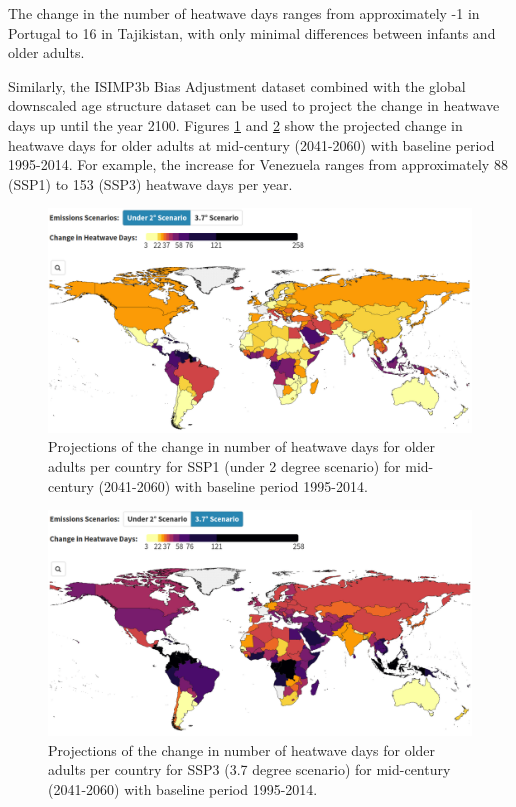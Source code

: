 \documentclass[
]{krantz}
\begin{document}
The change in the number of heatwave days ranges from approximately -1 in Portugal to 16 in Tajikistan, with only minimal differences between infants and older adults.

Similarly, the ISIMP3b Bias Adjustment dataset combined with the global downscaled age structure dataset can be used to project the change in heatwave days up until the year 2100. Figures \ref{fig:heatwaves2ssp1strobl} and \ref{fig:heatwaves2ssp3strobl} show the projected change in heatwave days for older adults at mid-century (2041-2060) with baseline period 1995-2014. For example, the increase for Venezuela ranges from approximately 88 (SSP1) to 153 (SSP3) heatwave days per year.

\begin{figure}

{\centering \includegraphics[width=0.8\linewidth]{work/08-lancet/figures/indicator_1_3} 

}

\caption{Projections of the change in number of heatwave days for older adults per country for SSP1 (under 2 degree scenario) for mid-century (2041-2060) with baseline period 1995-2014.}\label{fig:heatwaves2ssp1strobl}
\end{figure}
\begin{figure}

{\centering \includegraphics[width=0.8\linewidth]{work/08-lancet/figures/indicator_1_4} 

}

\caption{Projections of the change in number of heatwave days for older adults per country for SSP3 (3.7 degree scenario) for mid-century (2041-2060) with baseline period 1995-2014.}\label{fig:heatwaves2ssp3strobl}
\end{figure}
\end{document}
